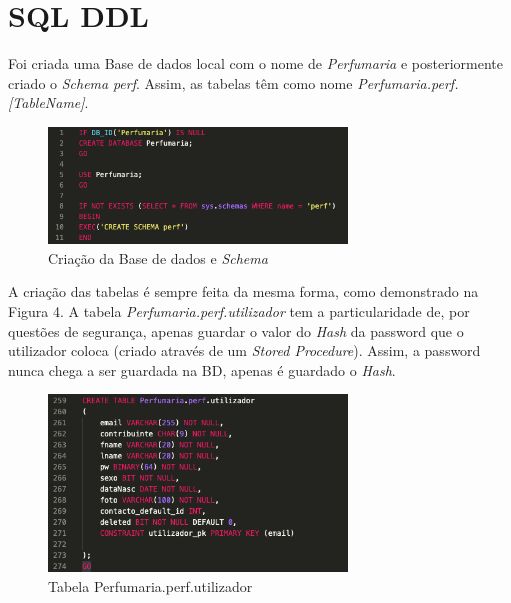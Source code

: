 \documentclass[10pt,portuguese]{article}
\begin{document}
\clearpage

\section{SQL DDL}

\par Foi criada uma Base de dados local com o nome de \textit{Perfumaria} e posteriormente criado o \textit{Schema} \textit{perf}. Assim, as tabelas têm como nome \textit{Perfumaria.perf.[TableName]}.

\begin{figure}[!h]
    \centering
    \includegraphics[width=300]{images/DDL_BD.png}
    \caption{Criação da Base de dados e \textit{Schema}}
\end{figure}

\par A criação das tabelas é sempre feita da mesma forma, como demonstrado na Figura 4. A tabela \textit{Perfumaria.perf.utilizador} tem a particularidade de, por questões de segurança, apenas guardar o valor do \textit{Hash} da password que o utilizador coloca (criado através de um \textit{Stored Procedure}). Assim, a password nunca chega a ser guardada na BD, apenas é guardado o \textit{Hash}. 

\begin{figure}[!h]
    \centering
    \includegraphics[width=300]{images/utilizador.png}
    \caption{Tabela Perfumaria.perf.utilizador}
\end{figure}
\end{document}
